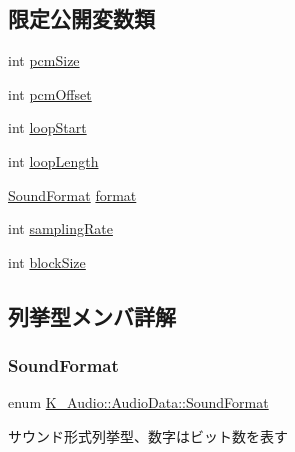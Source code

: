 \subsection*{限定公開変数類}
\begin{DoxyCompactItemize}
\item 
int \mbox{\hyperlink{class_k___audio_1_1_audio_data_a2d6bf30ca113346be54ac45e1ffcd05a}{pcm\+Size}}
\item 
int \mbox{\hyperlink{class_k___audio_1_1_audio_data_a8c1a6d96d9c2c55467baf9c0e7e58c98}{pcm\+Offset}}
\item 
int \mbox{\hyperlink{class_k___audio_1_1_audio_data_a94a2c5cc216653a4928e86953c03d0ba}{loop\+Start}}
\item 
int \mbox{\hyperlink{class_k___audio_1_1_audio_data_aeeeb3e8ef6215672507749088fe41266}{loop\+Length}}
\item 
\mbox{\hyperlink{class_k___audio_1_1_audio_data_a7ef9acd4f7d2140951605d835cff2435}{Sound\+Format}} \mbox{\hyperlink{class_k___audio_1_1_audio_data_a9dc7fef30a3ca815a829c1009a6ecc33}{format}}
\item 
int \mbox{\hyperlink{class_k___audio_1_1_audio_data_a6730a05b5833bbbeb5512d28a09df9ff}{sampling\+Rate}}
\item 
int \mbox{\hyperlink{class_k___audio_1_1_audio_data_a8e8445d5d8449b7b7bbafeaf893bad74}{block\+Size}}
\end{DoxyCompactItemize}


\subsection{列挙型メンバ詳解}
\mbox{\label{class_k___audio_1_1_audio_data_a7ef9acd4f7d2140951605d835cff2435}} 
\subsubsection{\texorpdfstring{Sound\+Format}{SoundFormat}}
{\footnotesize\ttfamily enum \mbox{\hyperlink{class_k___audio_1_1_audio_data_a7ef9acd4f7d2140951605d835cff2435}{K\+\_\+\+Audio\+::\+Audio\+Data\+::\+Sound\+Format}}}



サウンド形式列挙型、数字はビット数を表す 


